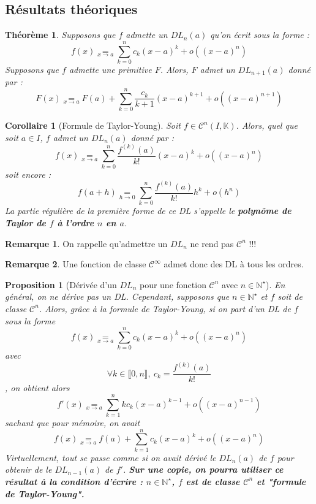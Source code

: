 \documentclass[french]{book}
\newcommand{\N}{\mathbb{N}}
\newcommand{\K}{\mathbb{K}}
\newcommand{\st}{^\star}
\theoremstyle{plain}
\newtheorem{thm}{Théorème}[chapter]
\newtheorem{prop}{Proposition}[chapter]
\newtheorem{cor}{Corollaire}[chapter]
\theoremstyle{definition}
\newtheorem{rmq}{Remarque}[chapter]
\theoremstyle{remark}
\begin{document}
\subsection{Résultats théoriques}
\begin{thm}
	Supposons que $f$ admette un $DL_n(a)$ qu'on écrit sous la forme : $$f(x)\underset{x\to a}{=}\sum_{k=0}^{n}c_k(x-a)^k+o\left((x-a)^n\right)$$ Supposons que $f$ admette une primitive $F$. Alors, $F$ admet un $DL_{n+1}(a)$ donné par : $$F(x)\underset{x\to a}{=}F(a)+\sum_{k=0}^{n}\frac{c_k}{k+1}(x-a)^{k+1}+o\left((x-a)^{n+1}\right)$$
\end{thm}
\begin{cor}[Formule de Taylor-Young]
	Soit $f\in\mathcal{C}^n(I,\K)$. Alors, quel que soit $a\in I$, $f$ admet un $DL_n(a)$ donné par : $$f(x)\underset{x\to a}{=}\sum_{k=0}^{n}\frac{f^{(k)}(a)}{k!}(x-a)^k+o\left((x-a)^n\right)$$ soit encore : $$f(a+h)\underset{h\to 0}{=}\sum_{k=0}^{n}\frac{f^{(k)}(a)}{k!}h^k+o\left(h^n\right)$$ La partie régulière de la première forme de ce DL s'appelle le \textbf{polynôme de Taylor de $f$ à l'ordre $n$ en $a$}.
\end{cor}
\begin{rmq}
	On rappelle qu'admettre un $DL_n$ ne rend pas $\mathcal{C}^n$ !!!
\end{rmq}
\begin{rmq}
	Une fonction de classe $\mathcal{C}^\infty$ admet donc des DL à tous les ordres.
\end{rmq}
\begin{prop}[Dérivée d'un $DL_n$ pour une fonction $\mathcal{C}^n$ avec $n\in\N\st$]
	En général, on ne dérive pas un DL. Cependant, supposons que $n\in\N\st$ et $f$ soit de classe $\mathcal{C}^n$. Alors, grâce à la formule de Taylor-Young, si on part d'un DL de $f$ sous la forme $$f(x)\underset{x\to a}{=}\sum_{k=0}^{n}c_k(x-a)^k+o\left((x-a)^n\right)$$ avec $$\forall k\in\llbracket0,n\rrbracket,\ c_k=\frac{f^{(k)}(a)}{k!}$$, on obtient alors $$f'(x)\underset{x\to a}{=}\sum_{k=1}^{n}kc_k(x-a)^{k-1}+o\left((x-a)^{n-1}\right)$$ sachant que pour mémoire, on avait $$f(x)\underset{x\to a}{=}f(a)+\sum_{k=1}^{n}c_k(x-a)^{k}+o\left((x-a)^{n}\right)$$ Virtuellement, tout se passe comme si on avait dérivé le $DL_n(a)$ de $f$ pour obtenir de le $DL_{n-1}(a)$ de $f'$. \textbf{Sur une copie, on pourra utiliser ce résultat à la condition d'écrire : $n\in\N\st$, $f$ est de classe $\mathcal{C}^n$ et "formule de Taylor-Young".}
\end{prop}
\end{document}
